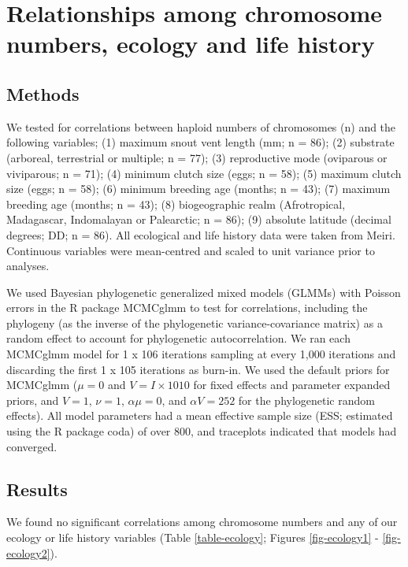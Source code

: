 \documentclass[a4paper, 12pt]{article}
\begin{document}
\section{Relationships among chromosome numbers, ecology and life history}

\subsection{Methods}

We tested for correlations between haploid numbers of chromosomes (n) and the following variables; (1) maximum snout vent length (mm; n = 86); (2) substrate (arboreal, terrestrial or multiple; n = 77); (3) reproductive mode (oviparous or viviparous; n = 71); (4) minimum clutch size (eggs; n = 58); (5) maximum clutch size (eggs; n = 58); (6) minimum breeding age (months; n = 43); (7) maximum breeding age (months; n = 43); (8) biogeographic realm (Afrotropical, Madagascar, Indomalayan or Palearctic; n = 86); (9) absolute latitude (decimal degrees; DD; n = 86). All ecological and life history data were taken from Meiri\cite{meiri2018traits}. Continuous variables were mean-centred and scaled to unit variance prior to analyses.

We used Bayesian phylogenetic generalized mixed models (GLMMs) with Poisson errors in the R package MCMCglmm\cite{hadfield2010mcmc} to test for correlations, including the phylogeny (as the inverse of the phylogenetic variance-covariance matrix) as a random effect to account for phylogenetic autocorrelation. We ran each MCMCglmm model for 1 x 106 iterations sampling at every 1,000 iterations and discarding the first 1 x 105 iterations as burn-in. We used the default priors for MCMCglmm ($\mu = 0$ and $V = I × 1010$ for fixed effects and parameter expanded priors, and $V = 1$, $\nu = 1$, $\alpha \mu = 0$, and $\alpha V = 252$ for the phylogenetic random effects). All model parameters had a mean effective sample size (ESS; estimated using the R package coda\cite{plummer2006coda}) of over 800, and traceplots indicated that models had converged.

\subsection{Results}

We found no significant correlations among chromosome numbers and any of our ecology or life history variables (Table \ref{table-ecology}; Figures \ref{fig-ecology1} - \ref{fig-ecology2}). 
\end{document}

